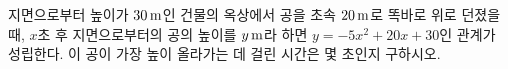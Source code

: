 지면으로부터 높이가 $30\mkern3mu \mathrm{m}$인 건물의 옥상에서 공을 초속 $20\mkern3mu \mathrm{m}$로 똑바로 위로 던졌을 때, $x$초 후 지면으로부터의 공의 높이를 $y\mkern3mu \mathrm{m}$라 하면 $y=-5x^2+20x+30$인 관계가 성립한다. 이 공이 가장 높이 올라가는 데 걸린 시간은 몇 초인지 구하시오.
